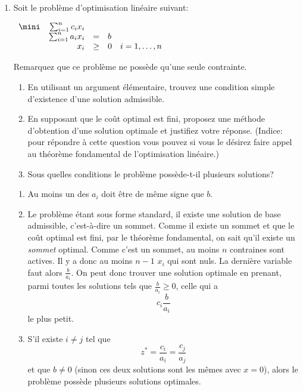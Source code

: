 \begin{enumerate}
  \item Soit le problème d'optimisation linéaire suivant:

    $
    \begin{array}{rrllll}
      \mini & \sum_{i=1}^n c_i x_i& & \\
      &\sum_{i=1}^n a_i x_i&=&b  \\
      &x_i  & \geq & 0 & i=1, \ldots, n
    \end{array}
    $




    Remarquez que ce problème ne possède qu'une seule contrainte.

    \begin{enumerate}
      \item  En utilisant un argument élémentaire, trouvez une condition simple d'existence d'une solution admissible.


      \item  En  supposant que le coût optimal est fini, proposez une méthode d'obtention d'une solution optimale et justifiez votre réponse. (Indice: pour répondre à cette question vous pouvez si vous le désirez faire appel au théorème fondamental de l'optimisation linéaire.)

      \item Sous quelles conditions le problème possède-t-il plusieurs solutions?

    \end{enumerate}



    \begin{solution}
      \begin{enumerate}
        \item Au moins un des $a_i$ doit être de même signe que $b$.
        \item Le problème étant sous forme standard, il existe une solution
          de base admissible, c'est-à-dire un sommet.
          Comme il existe un sommet et que le coût optimal est fini,
          par le théorème fondamental,
          on sait qu'il existe un \emph{sommet} optimal.
          Comme c'est un sommet, au moins $n$ contraines sont actives.
          Il y a donc au moins $n-1$ $x_i$ qui sont nuls.
          La dernière variable faut alors $\frac{b}{a_i}$.
          On peut donc trouver une solution optimale en prenant,
          parmi toutes les solutions tels que $\frac{b}{a_i} \geq 0$,
          celle qui a
          \[ c_i \frac{b}{a_i} \]
          le plus petit.
        \item S'il existe $i \neq j$ tel que
          \[ z^* = \frac{c_i}{a_i} = \frac{c_j}{a_j} \]
          et que $b \neq 0$ (sinon ces deux solutions sont les mêmes
          avec $x = 0$),
          alors le problème possède plusieurs solutions optimales.
      \end{enumerate}
    \end{solution}


\end{enumerate}

